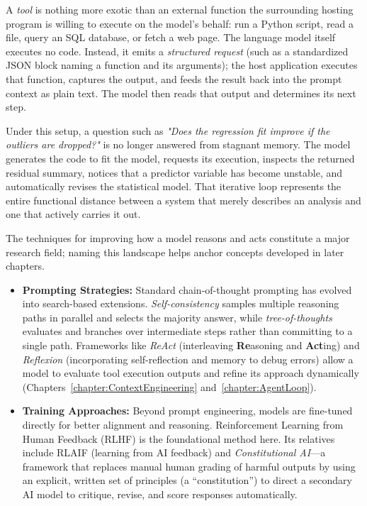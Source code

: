 \begin{example}
A \emph{tool} is nothing more exotic than an external function the surrounding hosting program is willing to execute on the model's behalf: run a Python script, read a file, query an SQL database, or fetch a web page.
The language model itself executes no code.
Instead, it emits a \emph{structured request} (such as a standardized JSON block naming a function and its arguments); the host application executes that function, captures the output, and feeds the result back into the prompt context as plain text.
The model then reads that output and determines its next step.

Under this setup, a question such as \emph{"Does the regression fit improve if the outliers are dropped?"} is no longer answered from stagnant memory.
The model generates the code to fit the model, requests its execution, inspects the returned residual summary, notices that a predictor variable has become unstable, and automatically revises the statistical model.
That iterative loop represents the entire functional distance between a system that merely describes an analysis and one that actively carries it out.
\end{example}


The techniques for improving how a model reasons and acts constitute a major research field; naming this landscape helps anchor concepts developed in later chapters.

\begin{itemize}
    \item \textbf{Prompting Strategies:} 
    Standard chain-of-thought prompting has evolved into search-based extensions.
    \emph{Self-consistency} samples multiple reasoning paths in parallel and selects the majority answer, while \emph{tree-of-thoughts} evaluates and branches over intermediate steps rather than committing to a single path.
    Frameworks like \emph{ReAct} (interleaving \textbf{Re}asoning and \textbf{Act}ing) and \emph{Reflexion} (incorporating self-reflection and memory to debug errors) allow a model to evaluate tool execution outputs and refine its approach dynamically (Chapters~\ref{chapter:ContextEngineering} and~\ref{chapter:AgentLoop}).

    \item \textbf{Training Approaches:} 
    Beyond prompt engineering, models are fine-tuned directly for better alignment and reasoning.
    Reinforcement Learning from Human Feedback (RLHF) is the foundational method here. Its relatives include RLAIF (learning from AI feedback) and \emph{Constitutional AI}—a framework that replaces manual human grading of harmful outputs by using an explicit, written set of principles (a ``constitution'') to direct a secondary AI model to critique, revise, and score responses automatically.
\end{itemize}


